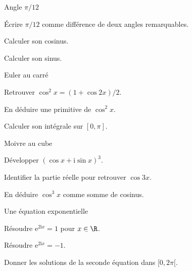 \begingroup\renewcommand{\otBesoinPlace}[1]{}\begin{minipage}{\linewidth}
\begin{exercice}[2]{Angle $\pi/12$}

\begin{questions}
\item Écrire $\pi/12$ comme différence de deux angles remarquables.
\item Calculer son cosinus.
\item Calculer son sinus.
\end{questions}
\end{exercice}
\begin{exercice}[2]{Euler au carré}

\begin{questions}
\item Retrouver $\cos^2x=(1+\cos2x)/2$.
\item En déduire une primitive de $\cos^2x$.
\item Calculer son intégrale sur $[0,\pi]$.
\end{questions}
\end{exercice}
\begin{exercice}[2]{Moivre au cube}

\begin{questions}
\item Développer $(\cos x+\mathrm i\sin x)^3$.
\item Identifier la partie réelle pour retrouver $\cos3x$.
\item En déduire $\cos^3x$ comme somme de cosinus.
\end{questions}
\end{exercice}
\begin{exercice}[2]{Une équation exponentielle}

\begin{questions}
\item Résoudre $\mathrm e^{2\mathrm ix}=1$ pour $x\in\R$.
\item Résoudre $\mathrm e^{2\mathrm ix}=-1$.
\item Donner les solutions de la seconde équation dans $[0,2\pi[$.
\end{questions}
\end{exercice}
\end{minipage}\endgroup
\clearpage
{}
